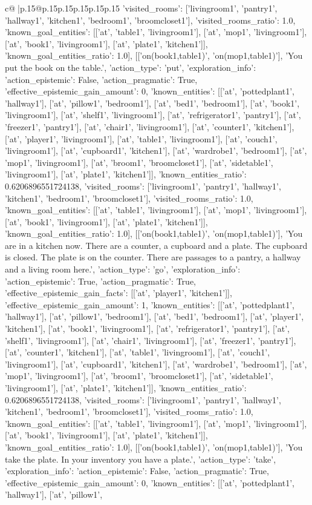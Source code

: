 \documentclass{article}
\begin{document}
{\begin{supertabular}{c@{$\;$}|p{.15\linewidth}@{}p{.15\linewidth}p{.15\linewidth}p{.15\linewidth}p{.15\linewidth}p{.15\linewidth}}
{{{'visited_rooms': ['livingroom1', 'pantry1', 'hallway1', 'kitchen1', 'bedroom1', 'broomcloset1'], 'visited_rooms_ratio': 1.0, 'known_goal_entities': [['at', 'table1', 'livingroom1'], ['at', 'mop1', 'livingroom1'], ['at', 'book1', 'livingroom1'], ['at', 'plate1', 'kitchen1']], 'known_goal_entities_ratio': 1.0}}], [['on(book1,table1)', 'on(mop1,table1)'], 'You put the book on the table.', {'action_type': 'put', 'exploration_info': {'action_epistemic': False, 'action_pragmatic': True, 'effective_epistemic_gain_amount': 0, 'known_entities': [['at', 'pottedplant1', 'hallway1'], ['at', 'pillow1', 'bedroom1'], ['at', 'bed1', 'bedroom1'], ['at', 'book1', 'livingroom1'], ['at', 'shelf1', 'livingroom1'], ['at', 'refrigerator1', 'pantry1'], ['at', 'freezer1', 'pantry1'], ['at', 'chair1', 'livingroom1'], ['at', 'counter1', 'kitchen1'], ['at', 'player1', 'livingroom1'], ['at', 'table1', 'livingroom1'], ['at', 'couch1', 'livingroom1'], ['at', 'cupboard1', 'kitchen1'], ['at', 'wardrobe1', 'bedroom1'], ['at', 'mop1', 'livingroom1'], ['at', 'broom1', 'broomcloset1'], ['at', 'sidetable1', 'livingroom1'], ['at', 'plate1', 'kitchen1']], 'known_entities_ratio': 0.6206896551724138, 'visited_rooms': ['livingroom1', 'pantry1', 'hallway1', 'kitchen1', 'bedroom1', 'broomcloset1'], 'visited_rooms_ratio': 1.0, 'known_goal_entities': [['at', 'table1', 'livingroom1'], ['at', 'mop1', 'livingroom1'], ['at', 'book1', 'livingroom1'], ['at', 'plate1', 'kitchen1']], 'known_goal_entities_ratio': 1.0}}], [['on(book1,table1)', 'on(mop1,table1)'], 'You are in a kitchen now. There are a counter, a cupboard and a plate. The cupboard is closed. The plate is on the counter. There are passages to a pantry, a hallway and a living room here.', {'action_type': 'go', 'exploration_info': {'action_epistemic': True, 'action_pragmatic': True, 'effective_epistemic_gain_facts': [['at', 'player1', 'kitchen1']], 'effective_epistemic_gain_amount': 1, 'known_entities': [['at', 'pottedplant1', 'hallway1'], ['at', 'pillow1', 'bedroom1'], ['at', 'bed1', 'bedroom1'], ['at', 'player1', 'kitchen1'], ['at', 'book1', 'livingroom1'], ['at', 'refrigerator1', 'pantry1'], ['at', 'shelf1', 'livingroom1'], ['at', 'chair1', 'livingroom1'], ['at', 'freezer1', 'pantry1'], ['at', 'counter1', 'kitchen1'], ['at', 'table1', 'livingroom1'], ['at', 'couch1', 'livingroom1'], ['at', 'cupboard1', 'kitchen1'], ['at', 'wardrobe1', 'bedroom1'], ['at', 'mop1', 'livingroom1'], ['at', 'broom1', 'broomcloset1'], ['at', 'sidetable1', 'livingroom1'], ['at', 'plate1', 'kitchen1']], 'known_entities_ratio': 0.6206896551724138, 'visited_rooms': ['livingroom1', 'pantry1', 'hallway1', 'kitchen1', 'bedroom1', 'broomcloset1'], 'visited_rooms_ratio': 1.0, 'known_goal_entities': [['at', 'table1', 'livingroom1'], ['at', 'mop1', 'livingroom1'], ['at', 'book1', 'livingroom1'], ['at', 'plate1', 'kitchen1']], 'known_goal_entities_ratio': 1.0}}], [['on(book1,table1)', 'on(mop1,table1)'], 'You take the plate. In your inventory you have a plate.', {'action_type': 'take', 'exploration_info': {'action_epistemic': False, 'action_pragmatic': True, 'effective_epistemic_gain_amount': 0, 'known_entities': [['at', 'pottedplant1', 'hallway1'], ['at', 'pillow1', }}}
\end{supertabular}}
\end{document}
